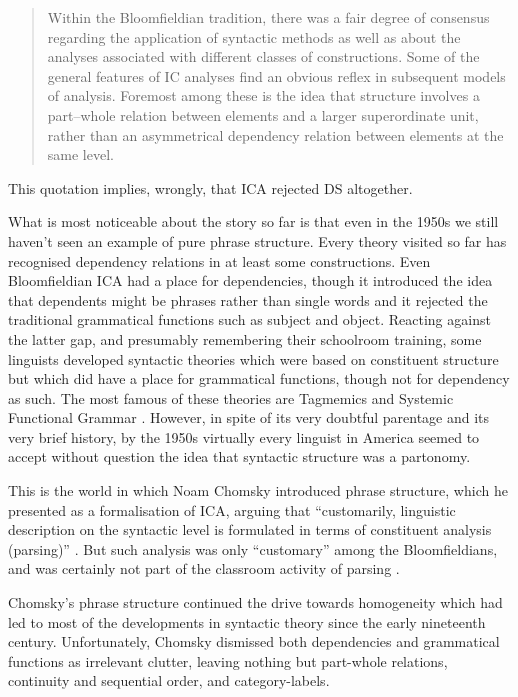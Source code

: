 \documentclass[output=paper]{langscibook}
\begin{document}
\begin{quotation}
	Within the Bloomfieldian tradition, there was a fair degree of consensus regarding the application of syntactic methods as well as about the analyses associated with different classes of constructions. Some of the general features of IC analyses find an obvious reflex in subsequent models of analysis. Foremost among these is the idea that structure involves a part–whole relation between elements and a larger superordinate unit, rather than an asymmetrical dependency relation between elements at the same level. \citep[202–203]{BlevinsSag2013}
\end{quotation}

This quotation implies, wrongly, that ICA rejected DS altogether.

What is most noticeable about the story so far is that even in the 1950s we still haven’t seen an example of pure phrase structure. Every theory visited so far has recognised dependency relations in at least some constructions. Even Bloomfieldian ICA had a place for dependencies, though it introduced the idea that dependents might be phrases rather than single words and it rejected the traditional grammatical functions such as subject and object. Reacting against the latter gap, and presumably remembering their schoolroom training, some linguists developed syntactic theories which were based on constituent structure but which did have a place for grammatical functions, though not for dependency as such. The most famous of these theories are Tagmemics \citep{Pike1954} and Systemic Functional Grammar \citep{Halliday1961,Halliday67b-u}. However, in spite of its very doubtful parentage and its very brief history, by the 1950s virtually every linguist in America seemed to accept without question the idea that syntactic structure was a partonomy.

This is the world in which Noam Chomsky introduced phrase structure, which he presented as a formalisation of ICA, arguing that ``customarily, linguistic description on the syntactic level is formulated in terms of constituent analysis (parsing)'' \citep[26]{Chomsky57a}. But such analysis was only ``customary'' among the Bloomfieldians, and was certainly not part of the classroom activity of parsing \citep[147]{Matthews1993}.

Chomsky’s phrase structure continued the drive towards homogeneity which had led to most of the developments in syntactic theory since the early nineteenth century. Unfortunately, Chomsky dismissed both dependencies and grammatical functions as irrelevant clutter, leaving nothing but part-whole relations, continuity and sequential order, and category-labels.
\end{document}

